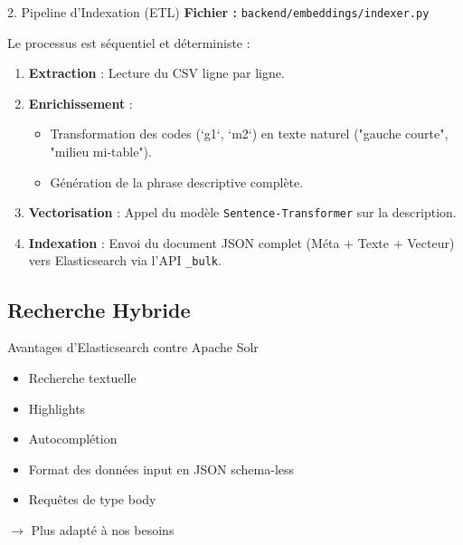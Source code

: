 \documentclass[aspectratio=169, 11pt]{beamer}
\begin{document}
\begin{frame}[fragile]{2. Pipeline d'Indexation (ETL)}
    \textbf{Fichier :} \texttt{backend/embeddings/indexer.py}
    
    Le processus est séquentiel et déterministe :
    
    \begin{enumerate}
        \item \textbf{Extraction} : Lecture du CSV ligne par ligne.
        \item \textbf{Enrichissement} : 
        \begin{itemize}
            \item Transformation des codes (`g1`, `m2`) en texte naturel ("gauche courte", "milieu mi-table").
            \item Génération de la phrase descriptive complète.
        \end{itemize}
        \item \textbf{Vectorisation} : Appel du modèle \texttt{Sentence-Transformer} sur la description.
        \item \textbf{Indexation} : Envoi du document JSON complet (Méta + Texte + Vecteur) vers Elasticsearch via l'API \texttt{\_bulk}.
    \end{enumerate}
\end{frame}



\subsection{Recherche Hybride}

\begin{frame}{Avantages d'Elasticsearch contre Apache Solr}
    \begin{itemize}
        \setlength\itemsep{1em}
        \item Recherche textuelle
        \item Highlights
        \item Autocomplétion
        \item Format des données input en JSON schema-less
        \item Requêtes de type body
    \end{itemize}
    
    \vspace{1cm}
    \centerline{\large $\to$ Plus adapté à nos besoins}
\end{frame}
\end{document}
